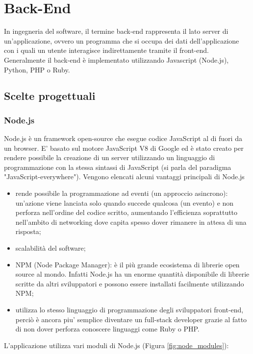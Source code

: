 \documentclass[12pt]{report}
\begin{document}
%
\section{Back-End}

In ingegneria del software, il termine back-end rappresenta il lato server di un'applicazione, ovvero un programma che si occupa dei dati dell'applicazione con i quali un utente interagisce indirettamente tramite il front-end. Generalmente il back-end è implementato utilizzando Javascript (Node.js), Python, PHP o Ruby.

\subsection{Scelte progettuali}

\subsubsection*{Node.js}

Node.js è un framework open-source che esegue codice JavaScript al di fuori da un browser. E' basato sul motore JavaScript V8 di Google ed è stato creato per rendere possibile la creazione di un server utilizzando un linguaggio di programmazione con la stessa sintassi di JavaScript (si parla del paradigma "JavaScript-everywhere"). Vengono elencati alcuni vantaggi principali di Node.js

\begin{itemize}
	\item rende possibile la programmazione ad eventi (un approccio asincrono): un'azione viene lanciata solo quando succede qualcosa (un evento) e non perforza nell'ordine del codice scritto, aumentando l'efficienza soprattutto nell'ambito di networking dove capita spesso dover rimanere in attesa di una risposta;
	\item scalabilità del software;
	\item NPM (Node Package Manager): è il più grande ecosistema di librerie open source al mondo. Infatti Node.js ha un enorme quantità disponibile di librerie scritte da altri sviluppatori e possono essere installati facilmente utilizzando NPM;
	\item utilizza lo stesso linguaggio di programmazione degli sviluppatori front-end, perciò è ancora piu' semplice diventare un full-stack developer grazie al fatto di non dover perforza conoscere linguaggi come Ruby o PHP.
\end{itemize}

L'applicazione utilizza vari moduli di Node.js (Figura \ref{fig:node_modules}):
\end{document}
